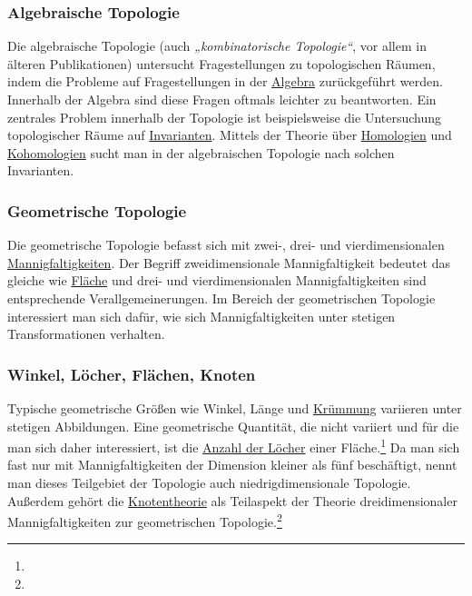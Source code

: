 \documentclass[12pt,]{article}
\begin{document}
\subsubsection{Algebraische Topologie}\label{algebraische-topologie}

Die algebraische Topologie (auch \emph{„kombinatorische Topologie``},
vor allem in älteren Publikationen) untersucht Fragestellungen zu
topologischen Räumen, indem die Probleme auf Fragestellungen in der
\url{Algebra} zurückgeführt werden. Innerhalb der Algebra sind diese
Fragen oftmals leichter zu beantworten. Ein zentrales Problem innerhalb
der Topologie ist beispielsweise die Untersuchung topologischer Räume
auf \href{Invariante_(Mathematik)}{Invarianten}. Mittels der Theorie
über \href{Homologie_(Mathematik)}{Homologien} und
\href{Kohomologie}{Kohomologien} sucht man in der algebraischen
Topologie nach solchen Invarianten.

\subsubsection{Geometrische Topologie}\label{geometrische-topologie}

Die geometrische Topologie befasst sich mit zwei-, drei- und
vierdimensionalen \href{Mannigfaltigkeit}{Mannigfaltigkeiten}. Der
Begriff zweidimensionale Mannigfaltigkeit bedeutet das gleiche wie
\href{Fläche_(Mathematik)}{Fläche} und drei- und vierdimensionalen
Mannigfaltigkeiten sind entsprechende Verallgemeinerungen. Im Bereich
der geometrischen Topologie interessiert man sich dafür, wie sich
Mannigfaltigkeiten unter stetigen Transformationen verhalten.

\subsubsection{Winkel, Löcher, Flächen,
Knoten}\label{winkel-luxf6cher-fluxe4chen-knoten}

Typische geometrische Größen wie Winkel, Länge und \url{Krümmung}
variieren unter stetigen Abbildungen. Eine geometrische Quantität, die
nicht variiert und für die man sich daher interessiert, ist die
\href{Geschlecht_(Fläche)}{Anzahl der Löcher} einer Fläche.\footnote{}
Da man sich fast nur mit Mannigfaltigkeiten der Dimension kleiner als
fünf beschäftigt, nennt man dieses Teilgebiet der Topologie auch
niedrigdimensionale Topologie. Außerdem gehört die \url{Knotentheorie}
als Teilaspekt der Theorie dreidimensionaler Mannigfaltigkeiten zur
geometrischen Topologie.\footnote{}
\end{document}
